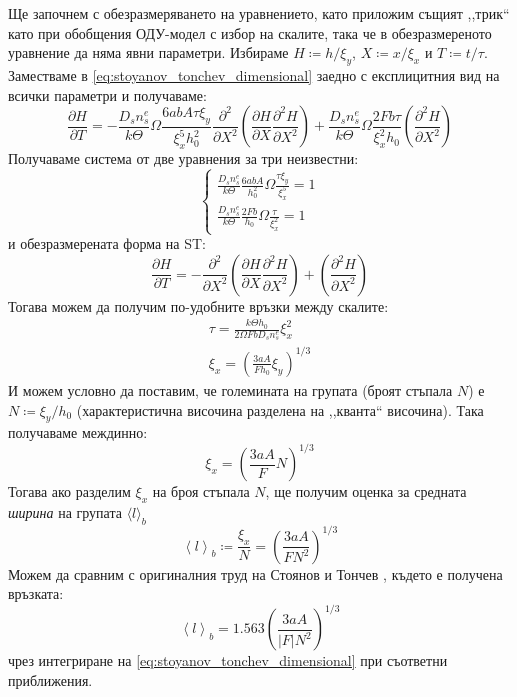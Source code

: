 Ще започнем с обезразмеряването на уравнението, като приложим същият ,,трик`` като при обобщения ОДУ-модел с избор на скалите, така че в обезразмереното уравнение да няма явни параметри. Избираме $H \coloneqq h/\xi_y$, $X \coloneqq x/\xi_x$ и $T \coloneqq t/\tau$. Заместваме в \autoref{eq:stoyanov_tonchev_dimensional} заедно с експлицитния вид на всички параметри и получаваме:
\begin{equation*}
\frac{{\partial H}}{{\partial T}} =  - \frac{{{D_s}n_s^e}}{{k\Theta }}\Omega \frac{{6abA\tau {\xi _y}}}{{\xi _x^5h_0^2}}\frac{{{\partial ^2}}}{{\partial {X^2}}}\left( {\frac{{\partial H}}{{\partial X}}\frac{{{\partial ^2}H}}{{\partial {X^2}}}} \right) + \frac{{{D_s}n_s^e}}{{k\Theta }}\Omega \frac{{2Fb\tau }}{{\xi _x^2{h_0}}}\left( {\frac{{{\partial ^2}H}}{{\partial {X^2}}}} \right)
\end{equation*}
Получаваме система от две уравнения за три неизвестни:
\begin{equation}
    \label{eq:stoyanov_tonchev_scales_system}
    \begin{cases}
        \frac{{{D_s}n_s^e}}{{k\Theta }}\frac{{6abA}}{{h_0^2}}\Omega \frac{{\tau {\xi _y}}}{{\xi _x^5}} = 1 \\
        \frac{{{D_s}n_s^e}}{{k\Theta }}\frac{{2Fb}}{{{h_0}}}\Omega \frac{\tau }{{\xi _x^2}} = 1
    \end{cases} 
\end{equation}
и обезразмерената форма на ST:
\begin{equation}
    \label{eq:stoyanov_tonchev_dimensionless}
    \frac{\partial H}{\partial T} = - \frac{\partial^2}{\partial X^2} \left( \frac{\partial H}{\partial X} \frac{\partial^2 H}{\partial X^2} \right) + \left( \frac{\partial^2 H}{\partial X^2} \right)
\end{equation}
Тогава можем да получим по-удобните връзки между скалите:
\begin{align*}
    \tau  = \frac{{k\Theta {h_0}}}{{2\Omega Fb{D_s}n_s^e}}\xi _x^2 \\
    {\xi _x} = {\left( {\frac{{3aA}}{{F{h_0}}}{\xi _y}} \right)^{1/3}}
\end{align*}
И можем условно да поставим, че големината на групата (броят стъпала $N$) е $N \coloneqq \xi_y / h_0$ (характеристична височина разделена на ,,кванта`` височина). Така получаваме междинно:
\begin{equation*}
    \xi_x = \left( \frac{3 a A}{F}  N \right) ^ {1/3}
\end{equation*}
Тогава ако разделим $\xi_{x}$ на броя стъпала $N$, ще получим оценка за средната \textit{ширина} на групата $\langle l\rangle_b$
\begin{equation*}
    {\left\langle l \right\rangle _b} \coloneqq \frac{{{\xi _x}}}{N} = {\left( {\frac{{3aA}}{{F{N^2}}}} \right)^{1/3}}
\end{equation*}
Можем да сравним с оригиналния труд на Стоянов и Тончев \cite{StoyanovTonchev}, където е получена връзката:
\begin{equation*}
    {\left\langle l \right\rangle _b} = 1.563{\left( {\frac{{3aA}}{{\left| F \right|{N^2}}}} \right)^{1/3}}
\end{equation*}
чрез интегриране на \autoref{eq:stoyanov_tonchev_dimensional} при съответни приближения.

